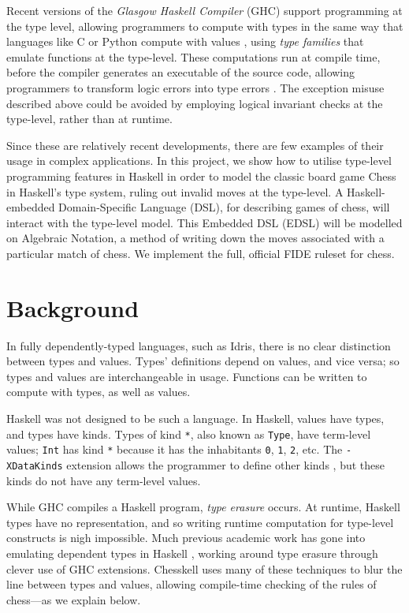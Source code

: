 \documentclass[12pt, a4paper, bibliography=totocnumbered]{scrartcl}
\begin{document}
Recent versions of the \emph{Glasgow Haskell Compiler} (GHC) support programming at the type level, allowing programmers to compute with types in the same way that languages like C or Python compute with values \cite{yorgey2012giving}, using \emph{type families} \cite{opentfs} \cite{closedtfs} that emulate functions at the type-level. These computations run at compile time, before the compiler generates an executable of the source code, allowing programmers to transform logic errors into type errors \cite{twt}. The exception misuse described above could be avoided by employing logical invariant checks at the type-level, rather than at runtime.

Since these are relatively recent developments, there are few examples of their usage in complex applications. In this project, we show how to utilise type-level programming features in Haskell in order to model the classic board game Chess in Haskell's type system, ruling out invalid moves at the type-level. A Haskell-embedded Domain-Specific Language (DSL), for describing games of chess, will interact with the type-level model. This Embedded DSL (EDSL) will be modelled on Algebraic Notation, a method of writing down the moves associated with a particular match of chess. We implement the full, official FIDE ruleset for chess.

\section{Background}

In fully dependently-typed languages, such as Idris, there is no clear distinction between types and values. Types' definitions depend on values, and vice versa; so types and values are interchangeable in usage. Functions can be written to compute with types, as well as values.

Haskell was not designed to be such a language. In Haskell, values have types, and types have kinds. Types of kind \lstinline{*}, also known as \lstinline{Type}, have term-level values; \lstinline{Int} has kind \lstinline{*} because it has the inhabitants \lstinline{0}, \lstinline{1}, \lstinline{2}, etc. The \lstinline{-XDataKinds} extension allows the programmer to define other kinds \cite{yorgey2012giving}, but these kinds do not have any term-level values.

While GHC compiles a Haskell program, \emph{type erasure} occurs. At runtime, Haskell types have no representation, and so writing runtime computation for type-level constructs is nigh impossible. Much previous academic work has gone into emulating dependent types in Haskell \cite{singletons}, working around type erasure through clever use of GHC extensions. Chesskell uses many of these techniques to blur the line between types and values, allowing compile-time checking of the rules of chess---as we explain below.
\end{document}
